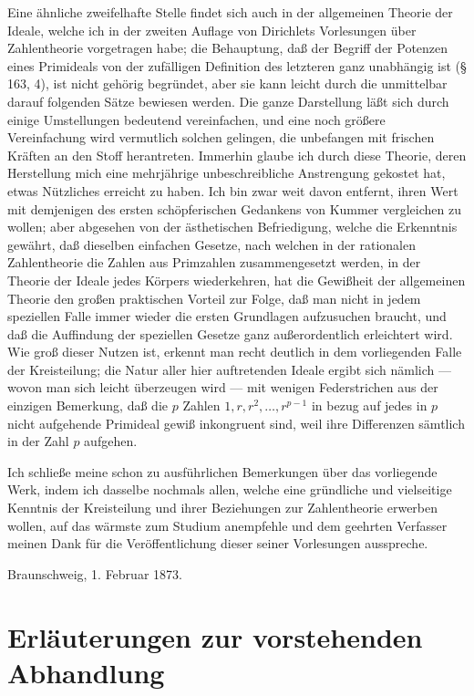 \documentclass[11pt]{article}
\newcommand{\origpage}[1]{\par\vspace{0.25em}\noindent{\footnotesize\itshape [Gedruckte Seite #1]}\par\vspace{0.25em}}
\begin{document}
\origpage{419}
Eine ähnliche zweifelhafte Stelle findet sich auch in der allgemeinen Theorie der Ideale, welche ich in der zweiten Auflage von Dirichlets Vorlesungen über Zahlentheorie vorgetragen habe; die Behauptung, daß der Begriff der Potenzen eines Primideals von der zufälligen Definition des letzteren ganz unabhängig ist (§ 163, 4), ist nicht gehörig begründet, aber sie kann leicht durch die unmittelbar darauf folgenden Sätze bewiesen werden. Die ganze Darstellung läßt sich durch einige Umstellungen bedeutend vereinfachen, und eine noch größere Vereinfachung wird vermutlich solchen gelingen, die unbefangen mit frischen Kräften an den Stoff herantreten. Immerhin glaube ich durch diese Theorie, deren Herstellung mich eine mehrjährige unbeschreibliche Anstrengung gekostet hat, etwas Nützliches erreicht zu haben. Ich bin zwar weit davon entfernt, ihren Wert mit demjenigen des ersten schöpferischen Gedankens von Kummer vergleichen zu wollen; aber abgesehen von der ästhetischen Befriedigung, welche die Erkenntnis gewährt, daß dieselben einfachen Gesetze, nach welchen in der rationalen Zahlentheorie die Zahlen aus Primzahlen zusammengesetzt werden, in der Theorie der Ideale jedes Körpers wiederkehren, hat die Gewißheit der allgemeinen Theorie den großen praktischen Vorteil zur Folge, daß man nicht in jedem speziellen Falle immer wieder die ersten Grundlagen aufzusuchen braucht, und daß die Auffindung der speziellen Gesetze ganz außerordentlich erleichtert wird. Wie groß dieser Nutzen ist, erkennt man recht deutlich in dem vorliegenden Falle der Kreisteilung; die Natur aller hier auftretenden Ideale ergibt sich nämlich --- wovon man sich leicht überzeugen wird --- mit wenigen Federstrichen aus der einzigen Bemerkung, daß die $p$ Zahlen $1,r,r^2,\ldots,r^{p-1}$ in bezug auf jedes in $p$ nicht aufgehende Primideal gewiß inkongruent sind, weil ihre Differenzen sämtlich in der Zahl $p$ aufgehen.

Ich schließe meine schon zu ausführlichen Bemerkungen über das vorliegende Werk, indem ich dasselbe nochmals allen, welche eine gründliche und vielseitige Kenntnis der Kreisteilung und ihrer Beziehungen zur Zahlentheorie erwerben wollen, auf das wärmste zum Studium anempfehle und dem geehrten Verfasser meinen Dank für die Veröffentlichung dieser seiner Vorlesungen ausspreche.

\begin{flushleft}Braunschweig, 1. Februar 1873.\end{flushleft}

\origpage{420}
\section*{Erläuterungen zur vorstehenden Abhandlung}
\end{document}
